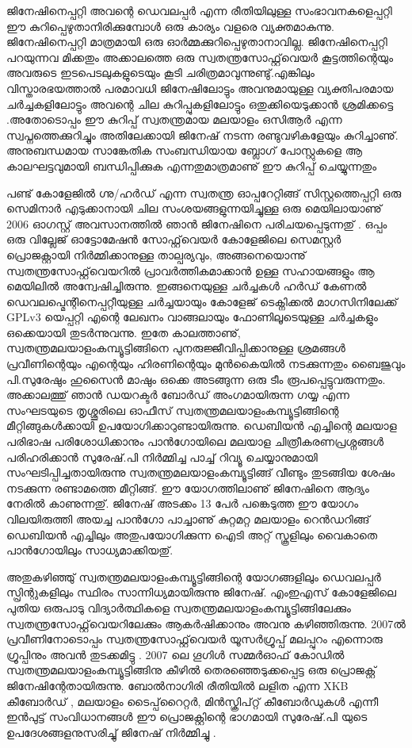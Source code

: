 \newpage
{}
ജിനേഷിനെപ്പറ്റി അവന്റെ ഡെവലപ്പര്‍ എന്ന രീതിയിലുള്ള സംഭാവനകളെപ്പറ്റി ഈ കുറിപ്പെഴുതാനിരിക്കുമ്പോള്‍ ഒരു കാര്യം വളരെ വ്യക്തമാകുന്നു. ജിനേഷിനെപ്പറ്റി മാത്രമായി ഒരു ഓര്‍മ്മക്കുറിപ്പെഴുതാനാവില്ല. ജിനേഷിനെപ്പറ്റി പറയുന്നവ മിക്കതും അക്കാലത്തെ ഒരു സ്വതന്ത്രസോഫ്റ്റ്‌വെയര്‍ കൂട്ടത്തിന്റെയും അവരുടെ ഇടപെടലുകളുടെയും കൂടി ചരിത്രമാവുന്നുണ്ടു്.എങ്കിലും വിസ്താരഭയത്താല്‍ പരമാവധി ജിനേഷിലോട്ടും അവനുമായുള്ള വ്യക്തിപരമായ ചര്‍ച്ചകളിലോട്ടും അവന്റെ ചില കുറിപ്പുകളിലോട്ടും ഒതുക്കിയെടുക്കാന്‍ ശ്രമിക്കട്ടെ .അതോടൊപ്പം ഈ കുറിപ്പ് സ്വതന്ത്രമായ മലയാളം ഒസിആര്‍ എന്ന സ്വപ്നത്തെക്കുറിച്ചും അതിലേക്കായി ജിനേഷ് നടന്ന രണ്ടുവഴികളേയും കുറിച്ചാണു്. അനുബന്ധമായ സാങ്കേതിക സംബന്ധിയായ ബ്ലോഗ് പോസ്റ്റുകളെ ആ കാലഘട്ടവുമായി ബന്ധിപ്പിക്കുക എന്നതുമാത്രമാണു് ഈ കുറിപ്പ് ചെയ്യുന്നതും 
 
പണ്ട്   കോളേജില്‍ ഗ്നു/ഹര്‍ഡ് എന്ന സ്വതന്ത്ര ഓപ്പറേറ്റിങ്ങ് സിസ്റ്റത്തെപ്പറ്റി  ഒരു സെമിനാര്‍ എടുക്കാനായി ചില സംശയങ്ങളുന്നയിച്ചുള്ള  ഒരു മെയിലായാണു് 2006 ഓഗസ്റ്റ് അവസാനത്തില്‍ ഞാന്‍  ജിനേഷിനെ പരിചയപ്പെടുന്നതു് . ഒപ്പം ഒരു വില്ലേജ് ഓട്ടോമേഷന്‍ സോഫ്റ്റ്‌വെയര്‍ കോളേജിലെ സെമസ്റ്റര്‍ പ്രൊജക്റ്റായി നിര്‍മ്മിക്കാനുള്ള താല്പര്യവും, അങ്ങനെയൊന്നു് സ്വതന്ത്രസോഫ്റ്റ്‌വെയറില്‍ പ്രാവര്‍ത്തികമാക്കാന്‍ ഉള്ള സഹായങ്ങളും ആ മെയിലില്‍  അന്വേഷിച്ചിരുന്നു.  ഇങ്ങനെയുള്ള ചര്‍ച്ചകള്‍  ഹര്‍ഡ് കേണല്‍ ഡെവലപ്മെന്റിനെപ്പറ്റീയുള്ള ചര്‍ച്ചയായും കോളേജ് ടെക്നിക്കല്‍ മാഗസിനിലേക്ക് GPLv3 യെപ്പറ്റി എന്റെ ലേഖനം വാങ്ങലായും  ഫോണിലൂടെയുള്ള ചര്‍ച്ചകളും ഒക്കെയായി തുടര്‍ന്നുവന്നു. ഇതേ കാലത്താണു്, സ്വതന്ത്രമലയാളംകമ്പ്യൂട്ടിങ്ങിനെ പുനരുജ്ജീവിപ്പിക്കാനുള്ള ശ്രമങ്ങള്‍ പ്രവീണിന്റെയും എന്റെയും ഹിരണിന്റെയും മുന്‍കൈയില്‍ നടക്കുന്നതും ബൈജുവും പി.സുരേഷും ഹുസൈന്‍ മാഷും ഒക്കെ അടങ്ങുന്ന ഒരു ടീം രൂപപ്പെട്ടുവരുന്നതും. അക്കാലത്തു് ഞാന്‍ ഡയറക്ടര്‍ ബോര്‍ഡ് അംഗമായിരുന്ന ഗയ്യ എന്ന സംഘടയുടെ തൃശ്ശൂരിലെ ഓഫീസ് സ്വതന്ത്രമലയാളംകമ്പ്യൂട്ടിങ്ങിന്റെ മീറ്റിങ്ങുകള്‍ക്കായി ഉപയോഗിക്കാറുണ്ടായിരുന്നു. ഡെബിയന്‍ എച്ചിന്റെ മലയാള പരിഭാഷ പരിശോധിക്കാനും പാന്‍ഗോയിലെ മലയാള ചിത്രീകരണപ്രശ്നങ്ങള്‍ പരിഹരിക്കാന്‍ സുരേഷ്.പി നിര്‍മ്മിച്ച പാച്ച് റിവ്യൂ ചെയ്യാനുമായി സംഘടിപ്പിച്ചതായിരുന്നു സ്വതന്ത്രമലയാളംകമ്പ്യൂട്ടിങ്ങ് വീണ്ടും തുടങ്ങിയ ശേഷം നടക്കുന്ന രണ്ടാമത്തെ മീറ്റിങ്ങ്. ഈ യോഗത്തിലാണു് ജിനേഷിനെ ആദ്യം നേരില്‍ കാണുന്നതു്. ജിനേഷ് അടക്കം 13 പേര്‍ പങ്കെടുത്ത ഈ യോഗം വിലയിരുത്തി അയച്ച പാന്‍ഗോ പാച്ചാണു് കുറ്റമറ്റ മലയാളം റെന്‍ഡറിങ്ങ് ഡെബിയന്‍ എച്ചിലും  അതുപയോഗിക്കുന്ന ഐടി അറ്റ് സ്കൂളിലും വൈകാതെ പാന്‍ഗോയിലും സാധ്യമാക്കിയതു്. 

അതുകഴിഞ്ഞു് സ്വതന്ത്രമലയാളംകമ്പ്യൂട്ടിങ്ങിന്റെ യോഗങ്ങളിലും ഡെവലപ്പര്‍ സ്പ്രിന്റുകളിലും സ്ഥിരം സാന്നിധ്യമായിരുന്നു ജിനേഷ്. എംഇഎസ് കോളേജിലെ പുതിയ ഒരുപാടു വിദ്യാര്‍ത്ഥികളെ സ്വതന്ത്രമലയാളംകമ്പ്യൂട്ടിങ്ങിലേക്കും സ്വതന്ത്രസോഫ്റ്റ്‌വെയറിലേക്കും ആകര്‍ഷിക്കാനും അവനു കഴിഞ്ഞിരുന്നു. 2007ല്‍ പ്രവീണിനോടൊപ്പം സ്വതന്ത്രസോഫ്റ്റ്‌വെയര്‍ യൂസര്‍ഗ്രൂപ്പ് മലപ്പുറം എന്നൊരു ഗ്രൂപ്പിനും അവന്‍ തുടക്കമിട്ടു . 2007 ലെ ഗൂഗിള്‍ സമ്മര്‍ഓഫ് കോഡില്‍ സ്വതന്ത്രമലയാളംകമ്പ്യൂട്ടിങ്ങിനു കീഴില്‍ തെരഞ്ഞെടുക്കപ്പെട്ട ഒരു പ്രൊജക്റ്റ് ജിനേഷിന്റേതായിരുന്നു. ബോല്‍നാഗിരി രീതിയില്‍ ലളിത എന്ന XKB കീബോര്‍ഡ് , മലയാളം ടൈപ്പ്‌റൈറ്റര്‍, മിന്‍സ്ക്രിപ്റ്റ്‌ കീബോര്‍ഡുകള്‍ എന്നീ ഇന്‍പുട്ട് സംവിധാനങ്ങള്‍ ഈ പ്രൊജക്റ്റിന്റെ ഭാഗമായി  സുരേഷ്.പി യുടെ ഉപദേശങ്ങളനുസരിച്ചു് ജിനേഷ് നിര്‍മ്മിച്ചു . 

